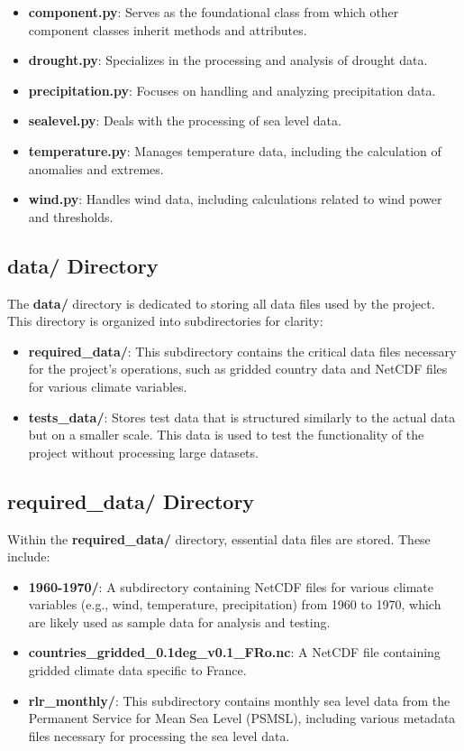 \documentclass[a4paper,12pt]{article}
\begin{document}
\begin{itemize}
    \item \textbf{component.py}: Serves as the foundational class from which other component classes inherit methods and attributes.
    \item \textbf{drought.py}: Specializes in the processing and analysis of drought data.
    \item \textbf{precipitation.py}: Focuses on handling and analyzing precipitation data.
    \item \textbf{sealevel.py}: Deals with the processing of sea level data.
    \item \textbf{temperature.py}: Manages temperature data, including the calculation of anomalies and extremes.
    \item \textbf{wind.py}: Handles wind data, including calculations related to wind power and thresholds.
\end{itemize}

\subsection{data/ Directory}
The \textbf{data/} directory is dedicated to storing all data files used by the project. This directory is organized into subdirectories for clarity:

\begin{itemize}
    \item \textbf{required\_data/}: This subdirectory contains the critical data files necessary for the project's operations, such as gridded country data and NetCDF files for various climate variables.
    \item \textbf{tests\_data/}: Stores test data that is structured similarly to the actual data but on a smaller scale. This data is used to test the functionality of the project without processing large datasets.
\end{itemize}

\subsection{required\_data/ Directory}
Within the \textbf{required\_data/} directory, essential data files are stored. These include:

\begin{itemize}
    \item \textbf{1960-1970/}: A subdirectory containing NetCDF files for various climate variables (e.g., wind, temperature, precipitation) from 1960 to 1970, which are likely used as sample data for analysis and testing.
    \item \textbf{countries\_gridded\_0.1deg\_v0.1\_FRo.nc}: A NetCDF file containing gridded climate data specific to France.
    \item \textbf{rlr\_monthly/}: This subdirectory contains monthly sea level data from the Permanent Service for Mean Sea Level (PSMSL), including various metadata files necessary for processing the sea level data.
\end{itemize}
\end{document}

